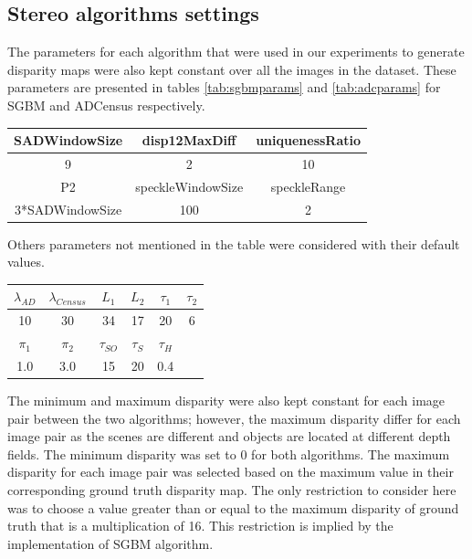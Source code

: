 \subsection{Stereo algorithms settings}
The parameters for each algorithm that were used in our experiments to generate disparity
maps were also kept constant over all the images in the dataset. These parameters are presented in tables \ref{tab:sgbmparams} and \ref{tab:adcparams} 
for SGBM and ADCensus respectively. \newline

{\footnotesize
\begin{minipage}{0.8\linewidth}
\begin{center}
\label{tab:sgbmparams}
\begin{tabular}{ |c|c|c| }
\hline
SADWindowSize & disp12MaxDiff & uniquenessRatio\\  \hline
9 & 2 & 10 \\ \hline
P2 & speckleWindowSize & speckleRange \\ \hline
3*SADWindowSize & 100 & 2  \\ \hline
\end{tabular}
\end{center}
\end{minipage} \newline \newline
}

Others parameters not mentioned in the table were considered with their default values. \newline


{\footnotesize
\begin{minipage}{0.8\linewidth}
\begin{center}
\label{tab:adcparams}
\begin{tabular}{|c|c|c|c|c|c|}
\hline
$\lambda_{AD}$ & $\lambda_{Census}$ & $L_{1}$ & $L_{2}$ & $\tau_{1}$ & $\tau_{2}$ \\  \hline
10 & 30 & 34 & 17 & 20 & 6  \\ \hline
$\pi_{1}$ & $\pi_{2}$ & $\tau_{SO}$ & $\tau_{S}$ & $\tau_{H}$ & \\  \hline
1.0 & 3.0 & 15 & 20 & 0.4 &  \\ \hline
\end{tabular}
\end{center}
\end{minipage} \newline
}

The minimum and maximum disparity were also kept constant for each image pair between the two algorithms; however, the maximum 
disparity differ for each image pair as the scenes are different
and objects are located at different depth fields.
The minimum disparity was set to $0$ for both algorithms. The maximum disparity for each image pair was selected based on the maximum value in their
corresponding ground truth disparity map. The only restriction to consider here was to choose a value greater than or equal to 
the maximum disparity of ground truth that is a multiplication of 16. This restriction
is implied by the implementation of SGBM algorithm.


